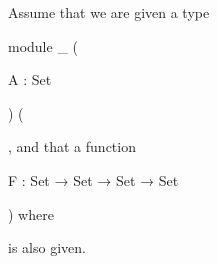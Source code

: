 \documentclass{article}
\begin{document}
Assume that we are given a type
%
\begin{code}[hide]
  module _ (
\end{code}
\begin{code}[inline]
    A : Set
\end{code}
\begin{code}[hide]
    ) (
\end{code}
%
,
and that a function
%
\begin{code}[inline*]
    F : Set → Set → Set → Set
\end{code}
\begin{code}[hide]
    ) where
\end{code}
%
is also given.
\end{document}
